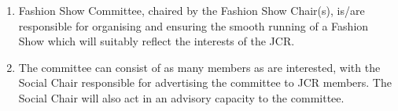 
\begin{enumerate}
    \item Fashion Show Committee, chaired by the Fashion Show Chair(s), is/are responsible for organising and ensuring the smooth running of a Fashion Show which will suitably reflect the interests of the JCR.
    \item The committee can consist of as many members as are interested, with the Social Chair responsible for advertising the committee to JCR members. The Social Chair will also act in an advisory capacity to the committee.
\end{enumerate}



